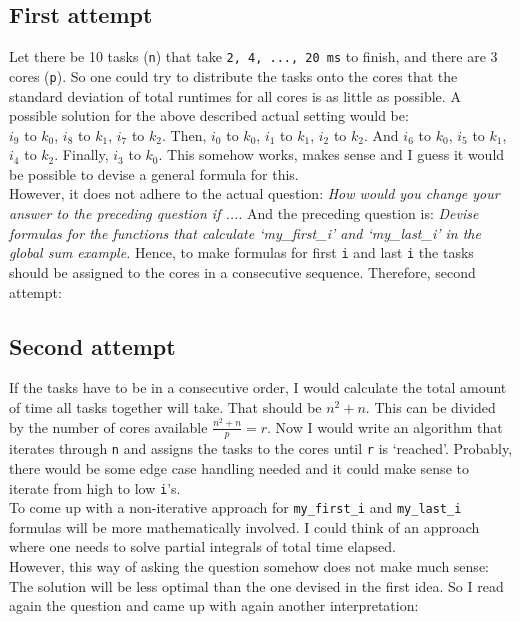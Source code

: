 \documentclass[a4paper,11pt,twoside]{article}
\begin{document}
\subsection{First attempt}
Let there be 10 tasks (\verb+n+) that take \verb+2, 4, ..., 20 ms+ to finish, and there are 3 cores (\verb+p+). So one could try to distribute the tasks onto the cores that the standard deviation of total runtimes for all cores is as little as possible. A possible solution for the above described actual setting would be:\\ $i_{9}$ to $k_{0}$, $i_{8}$ to $k_{1}$, $i_{7}$ to $k_{2}$. Then,  $i_{0}$ to $k_{0}$, $i_{1}$ to $k_{1}$, $i_{2}$ to $k_{2}$. And $i_{6}$ to $k_{0}$, $i_{5}$ to $k_{1}$, $i_{4}$ to $k_{2}$. Finally, $i_{3}$ to $k_{0}$. This somehow works, makes sense and I guess it would be possible to devise a general formula for this.\\
However, it does not adhere to the actual question: \textit{How would you change your answer to the preceding question if ...}. And the preceding question is: \textit{Devise formulas for the functions that calculate `my\_first\_i' and `my\_last\_i' in the global sum example.} Hence, to make formulas for first \verb+i+ and last \verb+i+ the tasks should be assigned to the cores in a consecutive sequence. Therefore, second attempt:

\subsection{Second attempt}
If the tasks have to be in a consecutive order, I would calculate the total amount of time all tasks together will take. That should be $n^{2}+n$. This can be divided by the number of cores available $\frac{n^{2}+n}{p}=r$. Now I would write an algorithm that iterates through \verb+n+ and assigns the tasks to the cores until \verb+r+ is `reached'. Probably, there would be some edge case handling needed and it could make sense to iterate from high to low \verb+i+'s.\\
To come up with a non-iterative approach for \verb+my_first_i+ and \verb+my_last_i+ formulas will be more mathematically involved. I could think of an approach where one needs to solve partial integrals of total time elapsed. \\
However, this way of asking the question somehow does not make much sense: The solution will be less optimal than the one devised in the first idea. So I read again the question and came up with again another interpretation:
\end{document}
